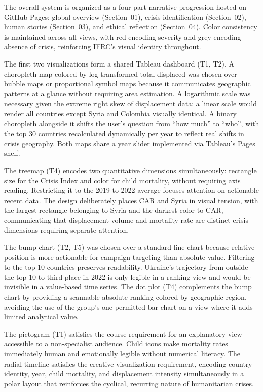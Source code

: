 \documentclass{article}
\begin{document}
The overall system is organized as a four-part narrative progression hosted on GitHub Pages: global overview (Section~01), crisis identification (Section~02), human stories (Section~03), and ethical reflection (Section~04). Color consistency is maintained across all views, with red encoding severity and grey encoding absence of crisis, reinforcing IFRC's visual identity throughout.

The first two visualizations form a shared Tableau dashboard (T1, T2). A choropleth map colored by log-transformed total displaced was chosen over bubble maps or proportional symbol maps because it communicates geographic patterns at a glance without requiring area estimation. A logarithmic scale was necessary given the extreme right skew of displacement data: a linear scale would render all countries except Syria and Colombia visually identical. A binary choropleth alongside it shifts the user's question from ``how much'' to ``who'', with the top 30 countries recalculated dynamically per year to reflect real shifts in crisis geography. Both maps share a year slider implemented via Tableau's Pages shelf.

The treemap (T4) encodes two quantitative dimensions simultaneously: rectangle size for the Crisis Index and color for child mortality, without requiring axis reading. Restricting it to the 2019 to 2022 average focuses attention on actionable recent data. The design deliberately places CAR and Syria in visual tension, with the largest rectangle belonging to Syria and the darkest color to CAR, communicating that displacement volume and mortality rate are distinct crisis dimensions requiring separate attention.

The bump chart (T2, T5) was chosen over a standard line chart because relative position is more actionable for campaign targeting than absolute value. Filtering to the top 10 countries preserves readability. Ukraine's trajectory from outside the top 10 to third place in 2022 is only legible in a ranking view and would be invisible in a value-based time series. The dot plot (T4) complements the bump chart by providing a scannable absolute ranking colored by geographic region, avoiding the use of the group's one permitted bar chart on a view where it adds limited analytical value.

The pictogram (T1) satisfies the course requirement for an explanatory view accessible to a non-specialist audience. Child icons make mortality rates immediately human and emotionally legible without numerical literacy. The radial timeline satisfies the creative visualization requirement, encoding country identity, year, child mortality, and displacement intensity simultaneously in a polar layout that reinforces the cyclical, recurring nature of humanitarian crises.
\end{document}

